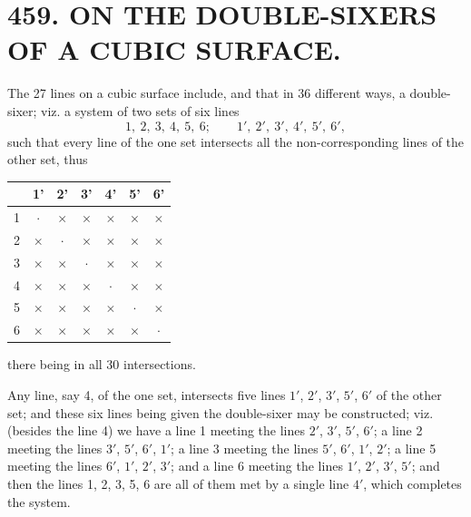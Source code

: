 \documentclass[11pt,a4paper]{article}
\newcommand{\article}[2]{\section*{#1. #2}}
\begin{document}
\newpage
\setcounter{page}{316}

\article{459}{ON THE DOUBLE-SIXERS OF A CUBIC SURFACE.}


\vspace{0.5em}

The 27 lines on a cubic surface include, and that in 36 different ways, a double-sixer; viz. a system of two sets of six lines
\[
1,\ 2,\ 3,\ 4,\ 5,\ 6;\qquad 1',\ 2',\ 3',\ 4',\ 5',\ 6',
\]
such that every line of the one set intersects all the non-corresponding lines of the other set, thus
\begin{center}
\begin{tabular}{c|cccccc}
& 1' & 2' & 3' & 4' & 5' & 6'\\\hline
1 & $\cdot$ & $\times$ & $\times$ & $\times$ & $\times$ & $\times$\\
2 & $\times$ & $\cdot$ & $\times$ & $\times$ & $\times$ & $\times$\\
3 & $\times$ & $\times$ & $\cdot$ & $\times$ & $\times$ & $\times$\\
4 & $\times$ & $\times$ & $\times$ & $\cdot$ & $\times$ & $\times$\\
5 & $\times$ & $\times$ & $\times$ & $\times$ & $\cdot$ & $\times$\\
6 & $\times$ & $\times$ & $\times$ & $\times$ & $\times$ & $\cdot$
\end{tabular}
\end{center}
there being in all 30 intersections.

Any line, say 4, of the one set, intersects five lines $1'$, $2'$, $3'$, $5'$, $6'$ of the other set; and these six lines being given the double-sixer may be constructed; viz. (besides the line 4) we have a line 1 meeting the lines $2'$, $3'$, $5'$, $6'$; a line 2 meeting the lines $3'$, $5'$, $6'$, $1'$; a line 3 meeting the lines $5'$, $6'$, $1'$, $2'$; a line 5 meeting the lines $6'$, $1'$, $2'$, $3'$; and a line 6 meeting the lines $1'$, $2'$, $3'$, $5'$; and then the lines 1, 2, 3, 5, 6 are all of them met by a single line $4'$, which completes the system.
\end{document}
